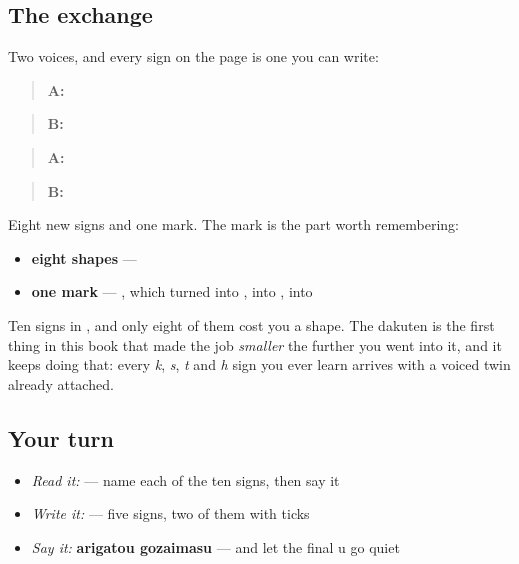 \subsection*{The exchange}
Two voices, and every sign on the page is one you can write:

\begin{quote}
\textbf{A:} 
\end{quote}

\begin{quote}
\textbf{B:} 
\end{quote}

\begin{quote}
\textbf{A:} 
\end{quote}

\begin{quote}
\textbf{B:} 
\end{quote}

\begin{grammarlens}[title={What you've built this chapter}]
Eight new signs and one mark. The mark is the part worth remembering:

\begin{itemize}
\raggedright
  \item \textbf{eight shapes} —        
  \item \textbf{one mark} — , which turned  into ,  into ,  into 
\end{itemize}

Ten signs in , and only eight of them cost you a shape. The dakuten is the first thing in this book that made the job \emph{smaller} the further you went into it, and it keeps doing that: every \emph{k}, \emph{s}, \emph{t} and \emph{h} sign you ever learn arrives with a voiced twin already attached.
\end{grammarlens}

\subsection*{Your turn}
\begin{itemize}
\raggedright
  \item \emph{Read it:}  — name each of the ten signs, then say it
  \item \emph{Write it:}  — five signs, two of them with ticks
  \item \emph{Say it:} \textbf{arigatou gozaimasu} — and let the final u go quiet
\end{itemize}

